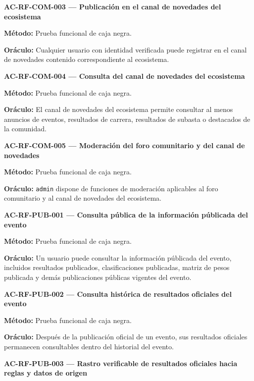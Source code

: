 \documentclass[10pt,letterpaper]{article}
\begin{document}
\noindent\textbf{AC-RF-COM-003 --- Publicación en el canal de novedades del ecosistema}\par
\textbf{Método:} Prueba funcional de caja negra.\par
\textbf{Oráculo:} Cualquier usuario con identidad verificada puede registrar en el canal de novedades contenido correspondiente al ecosistema.\par\vspace{0.45em}
\noindent\textbf{AC-RF-COM-004 --- Consulta del canal de novedades del ecosistema}\par
\textbf{Método:} Prueba funcional de caja negra.\par
\textbf{Oráculo:} El canal de novedades del ecosistema permite consultar al menos anuncios de eventos, resultados de carrera, resultados de subasta o destacados de la comunidad.\par\vspace{0.45em}
\noindent\textbf{AC-RF-COM-005 --- Moderación del foro comunitario y del canal de novedades}\par
\textbf{Método:} Prueba funcional de caja negra.\par
\textbf{Oráculo:} \texttt{admin} dispone de funciones de moderación aplicables al foro comunitario y al canal de novedades del ecosistema.\par\vspace{0.45em}
\noindent\textbf{AC-RF-PUB-001 --- Consulta pública de la información públicada del evento}\par
\textbf{Método:} Prueba funcional de caja negra.\par
\textbf{Oráculo:} Un usuario puede consultar la información públicada del evento, incluidos resultados publicados, clasificaciones publicadas, matriz de pesos publicada y demás publicaciones públicas vigentes del evento.\par\vspace{0.45em}
\noindent\textbf{AC-RF-PUB-002 --- Consulta histórica de resultados oficiales del evento}\par
\textbf{Método:} Prueba funcional de caja negra.\par
\textbf{Oráculo:} Después de la publicación oficial de un evento, sus resultados oficiales permanecen consultables dentro del historial del evento.\par\vspace{0.45em}
\noindent\textbf{AC-RF-PUB-003 --- Rastro verificable de resultados oficiales hacia reglas y datos de origen}\par
\end{document}
